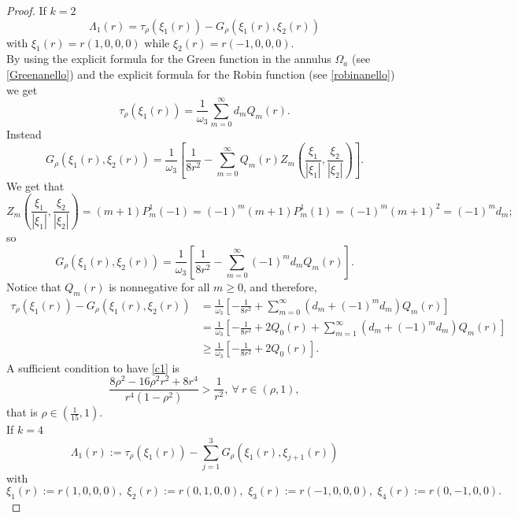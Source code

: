 \documentclass[10pt,a4paper]{amsart}
\begin{document}
\begin{proof}
If $k=2$
$$\Lambda_1(r)=\tau_\rho(\xi_1(r))-G_\rho(\xi_1(r), \xi_{2}(r))$$  with
 $\xi_1(r)=r(1, 0, 0, 0)$ while $\xi_2(r)=r(-1, 0, 0, 0)$.\\ 
By using the explicit formula for the Green function in the annulus $\Omega_{a}$ (see \eqref{Greenanello}) and the explicit formula for the Robin function (see \eqref{robinanello}) we get
\begin{equation*}
\tau_\rho(\xi_1(r)) = \frac{1}{\omega_3} \sum_{m=0}^{\infty} d_{m} Q_{m}(r).
\end{equation*}
Instead
\begin{equation*}
G_\rho(\xi_1(r),\xi_2(r)) = \frac{1}{\omega_3} \left[ \frac{1}{8r^{2}} - \sum_{m=0}^{\infty} Q_{m}(r) Z_{m}\left(\frac{\xi_1}{|\xi_1|}, \frac{\xi_2}{|\xi_2|}\right) \right].
\end{equation*}
We get that
\begin{equation*}
Z_{m}\left(\frac{\xi_1}{|\xi_1|}, \frac{\xi_2}{|\xi_2|}\right) = (m+1)P_{m}^{1}(-1)=(-1)^{m}(m+1)P_{m}^{1}(1)=(-1)^{m}(m+1)^{2}=(-1)^m d_m;
\end{equation*}
so
\begin{equation*}
G_\rho(\xi_1(r),\xi_2(r)) = \frac{1}{\omega_3} \left[ \frac{1}{8r^{2}} - \sum_{m=0}^{\infty} (-1)^{m} d_m Q_{m}(r) \right].
\end{equation*}
Notice that $Q_{m}(r)$ is nonnegative for all $m \geq 0$, and therefore,
\begin{equation*}
\begin{aligned}
\tau_\rho(\xi_1(r))-G_\rho(\xi_1(r),\xi_2(r)) & = \frac{1}{\omega_3} \left[ -\frac{1}{8r^{2}} + \sum_{m=0}^{\infty} (d_m+ (-1)^{m} d_m) Q_{m}(r) \right]
\\& = \frac{1}{\omega_3} \left[ -\frac{1}{8r^{2}} + 2Q_{0}(r) + \sum_{m=1}^{\infty} (d_m+ (-1)^{m} d_m) Q_{m}(r) \right]
\\& \geq \frac{1}{\omega_3} \left[ - \frac{1}{8r^{2}} + 2Q_{0}(r) \right].\end{aligned}
\end{equation*}
A sufficient condition to have \eqref{c1} is 
\begin{equation*}
\frac{8\rho^2 -16\rho^2r^2+8r^4}{r^{4}(1-\rho^2)} > \frac{1}{r^2}, \   \forall\ r \in (\rho,1),
\end{equation*}
that is $\rho \in (\frac{1}{15}, 1)$.\\ 
If $k=4$
$$\Lambda_1(r):=\tau_\rho(\xi_1(r))-\sum_{j=1}^3 G_\rho(\xi_1(r), \xi_{j+1}(r))$$ with $$\xi_1(r):=r(1, 0, 0, 0),\,\, \xi_2(r):=r(0, 1, 0, 0), \,\, \xi_3(r):=r(-1, 0, 0, 0),\,\, \xi_4(r):=r (0, -1, 0, 0).$$ 

\end{proof}
\end{document}
